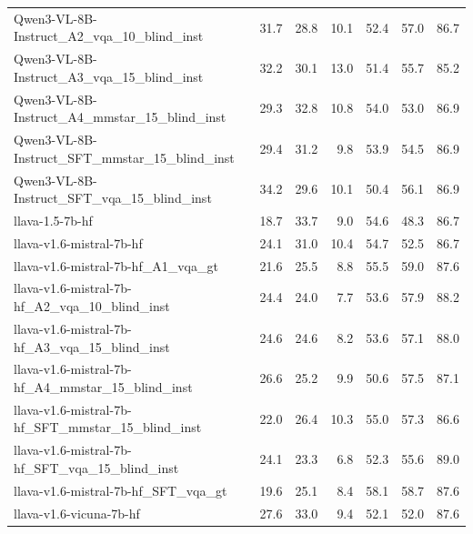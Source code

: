 \begin{tabular}{lrrrrrr}
Qwen3-VL-8B-Instruct_A2_vqa_10_blind_inst & 31.7 & 28.8 & 10.1 & 52.4 & 57.0 & 86.7 \\
Qwen3-VL-8B-Instruct_A3_vqa_15_blind_inst & 32.2 & 30.1 & 13.0 & 51.4 & 55.7 & 85.2 \\
Qwen3-VL-8B-Instruct_A4_mmstar_15_blind_inst & 29.3 & 32.8 & 10.8 & 54.0 & 53.0 & 86.9 \\
Qwen3-VL-8B-Instruct_SFT_mmstar_15_blind_inst & 29.4 & 31.2 & 9.8 & 53.9 & 54.5 & 86.9 \\
Qwen3-VL-8B-Instruct_SFT_vqa_15_blind_inst & 34.2 & 29.6 & 10.1 & 50.4 & 56.1 & 86.9 \\
llava-1.5-7b-hf & 18.7 & 33.7 & 9.0 & 54.6 & 48.3 & 86.7 \\
llava-v1.6-mistral-7b-hf & 24.1 & 31.0 & 10.4 & 54.7 & 52.5 & 86.7 \\
llava-v1.6-mistral-7b-hf_A1_vqa_gt & 21.6 & 25.5 & 8.8 & 55.5 & 59.0 & 87.6 \\
llava-v1.6-mistral-7b-hf_A2_vqa_10_blind_inst & 24.4 & 24.0 & 7.7 & 53.6 & 57.9 & 88.2 \\
llava-v1.6-mistral-7b-hf_A3_vqa_15_blind_inst & 24.6 & 24.6 & 8.2 & 53.6 & 57.1 & 88.0 \\
llava-v1.6-mistral-7b-hf_A4_mmstar_15_blind_inst & 26.6 & 25.2 & 9.9 & 50.6 & 57.5 & 87.1 \\
llava-v1.6-mistral-7b-hf_SFT_mmstar_15_blind_inst & 22.0 & 26.4 & 10.3 & 55.0 & 57.3 & 86.6 \\
llava-v1.6-mistral-7b-hf_SFT_vqa_15_blind_inst & 24.1 & 23.3 & 6.8 & 52.3 & 55.6 & 89.0 \\
llava-v1.6-mistral-7b-hf_SFT_vqa_gt & 19.6 & 25.1 & 8.4 & 58.1 & 58.7 & 87.6 \\
llava-v1.6-vicuna-7b-hf & 27.6 & 33.0 & 9.4 & 52.1 & 52.0 & 87.6 \\
\bottomrule
\end{tabular}
